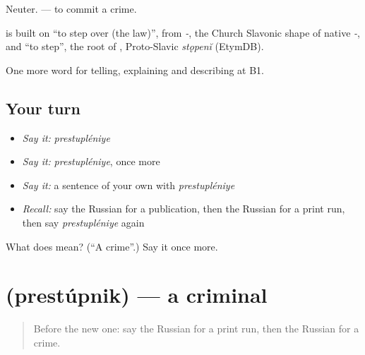 Neuter. \emph{ } — to commit a crime.

\begin{cousinweb}
\emph{} is built on \emph{} \textquotedblleft{}to step over (the law)\textquotedblright{}, from \emph{-}, the Church Slavonic shape of native \emph{-}, and \emph{} \textquotedblleft{}to step\textquotedblright{}, the root of \emph{}, Proto-Slavic \emph{stǫpenĭ} (EtymDB).
\end{cousinweb}

\begin{grammarlens}[title={What you've built}]
One more word for telling, explaining and describing at B1.
\end{grammarlens}

\subsection*{Your turn}
\begin{itemize}
\raggedright
  \item \emph{Say it:} \emph{prestupléniye}
  \item \emph{Say it:} \emph{prestupléniye}, once more
  \item \emph{Say it:} a sentence of your own with \emph{prestupléniye}
  \item \emph{Recall:} say the Russian for a publication, then the Russian for a print run, then say \emph{prestupléniye} again
\end{itemize}

\begin{tcolorbox}[breakable,colback=teal!4,colframe=teal!35!black,title={Before you move on}]
What does  mean? (\textquotedblleft{}A crime\textquotedblright{}.) Say it once more.
\end{tcolorbox}
\section[\texorpdfstring{\ru{преступник} (prestúpnik)}{преступник (prestúpnik)}]{ (prestúpnik) — a criminal}

\label{lesson:RU-C287-prestupnik}



\begin{quote}
Before the new one: say the Russian for a print run, then the Russian for a crime.
\end{quote}

